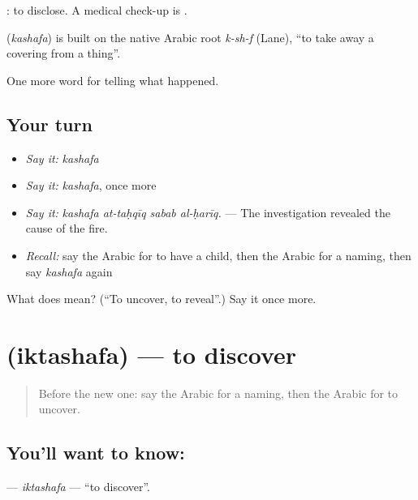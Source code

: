  : to disclose. A medical check-up is  .

\begin{cousinweb}
\textbf{} (\emph{kashafa}) is built on the native Arabic root \emph{k-sh-f} (Lane), \textquotedblleft{}to take away a covering from a thing\textquotedblright{}.
\end{cousinweb}

\begin{grammarlens}[title={What you've built}]
One more word for telling what happened.
\end{grammarlens}

\subsection*{Your turn}
\begin{itemize}
\raggedright
  \item \emph{Say it:} \emph{kashafa}
  \item \emph{Say it:} \emph{kashafa}, once more
  \item \emph{Say it:} \emph{kashafa at-taḥqīq sabab al-ḥarīq.} — The investigation revealed the cause of the fire.
  \item \emph{Recall:} say the Arabic for to have a child, then the Arabic for a naming, then say \emph{kashafa} again
\end{itemize}

\begin{tcolorbox}[breakable,colback=teal!4,colframe=teal!35!black,title={Before you move on}]
What does  mean? (\textquotedblleft{}To uncover, to reveal\textquotedblright{}.) Say it once more.
\end{tcolorbox}
\section[\texorpdfstring{\ar{اكتشف} (iktashafa)}{اكتشف (iktashafa)}]{ (iktashafa) — to discover}

\label{lesson:AR-C312-iktashafa}



\begin{quote}
Before the new one: say the Arabic for a naming, then the Arabic for to uncover.
\end{quote}

\subsection*{You'll want to know: }
\textbf{} — \emph{iktashafa} — \textquotedblleft{}to discover\textquotedblright{}.


